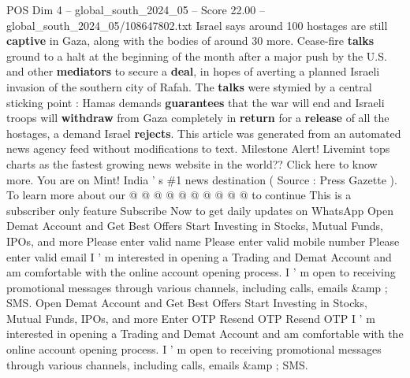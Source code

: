 \begin{textsample}{POS Dim 4 – global\_south\_2024\_05 – Score 22.00 – global\_south\_2024\_05/108647802.txt}
Israel says around 100 hostages are still \textbf{captive} in Gaza, along with the bodies of around 30 more.
Cease-fire \textbf{talks} ground to a halt at the beginning of the month after a major push by the U.S. and other \textbf{mediators} to secure a \textbf{deal}, in hopes of averting a planned Israeli invasion of the southern city of Rafah.
The \textbf{talks} were stymied by a central sticking point : Hamas demands \textbf{guarantees} that the war will end and Israeli troops will \textbf{withdraw} from Gaza completely in \textbf{return} for a \textbf{release} of all the hostages, a demand Israel \textbf{rejects}.
This article was generated from an automated news agency feed without modifications to text.
Milestone Alert!
Livemint tops charts as the fastest growing news website in the world??
Click here to know more.
You are on Mint!
India ' s \#1 news destination ( Source : Press Gazette ).
To learn more about our @ @ @ @ @ @ @ @ @ @ to continue This is a subscriber only feature Subscribe Now to get daily updates on WhatsApp Open Demat Account and Get Best Offers Start Investing in Stocks, Mutual Funds, IPOs, and more Please enter valid name Please enter valid mobile number Please enter valid email I ' m interested in opening a Trading and Demat Account and am comfortable with the online account opening process.
I ' m open to receiving promotional messages through various channels, including calls, emails \&amp ; SMS.
Open Demat Account and Get Best Offers Start Investing in Stocks, Mutual Funds, IPOs, and more Enter OTP Resend OTP Resend OTP I ' m interested in opening a Trading and Demat Account and am comfortable with the online account opening process.
I ' m open to receiving promotional messages through various channels, including calls, emails \&amp ; SMS.

\end{textsample}
